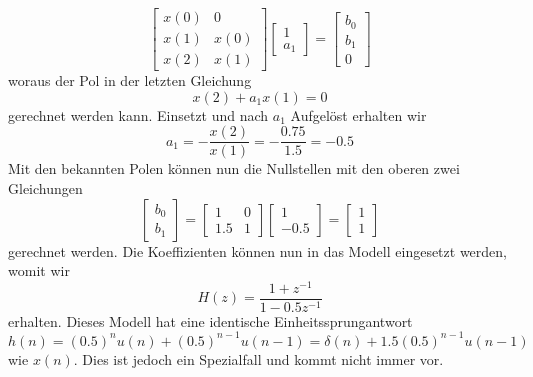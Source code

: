 \begin{equation}\left[\begin{array}{ll}
x(0) & 0 \\
x(1) & x(0) \\
x(2) & x(1)
\end{array}\right]\left[\begin{array}{c}
1 \\
a_1
\end{array}\right]=\left[\begin{array}{c}
b_0 \\
b_1\\
0
\end{array}\right]\end{equation}
woraus der Pol in der letzten Gleichung 
\begin{equation}
x(2)+a_1 x(1)=0
\end{equation}
gerechnet werden kann.
Einsetzt und nach $a_1$ Aufgelöst erhalten wir
\begin{equation}
a_1=-\frac{x(2)}{x(1)}=
-\frac{0.75}{1.5}=
-0.5
\end{equation}
Mit den bekannten Polen können nun die Nullstellen mit den oberen zwei Gleichungen 
\begin{equation}\left[\begin{array}{c}
b_0 \\
b_1
\end{array}\right]=\left[\begin{array}{cc}
1 & 0 \\
1.5 & 1
\end{array}\right]\left[\begin{array}{c}
1 \\
-0.5
\end{array}\right]=\left[\begin{array}{l}
1 \\
1
\end{array}\right]\end{equation}
gerechnet werden.
Die Koeffizienten können nun in das Modell eingesetzt werden, womit wir
\begin{equation}
H(z)=\frac{1+z^{-1}}{1-0.5 z^{-1}}
\end{equation}
erhalten.
Dieses Modell hat eine identische Einheitssprungantwort 
\begin{equation}
h(n)=(0.5)^{n} u(n)+(0.5)^{n-1} u(n-1)
=
\delta(n)+1.5(0.5)^{n-1} u(n-1)\end{equation}
wie $x(n)$.
Dies ist jedoch ein Spezialfall und kommt nicht immer vor.






